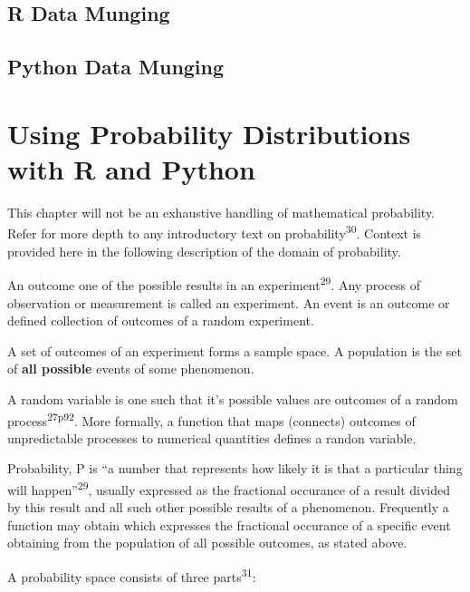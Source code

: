 \documentclass[]{book}
\theoremstyle{definition}
\theoremstyle{definition}
\theoremstyle{definition}
\theoremstyle{remark}
\begin{document}

\section{R Data Munging}\label{r-data-munging}


\section{Python Data Munging}\label{python-data-munging}


\chapter{Using Probability Distributions with R and
Python}\label{using-probability-distributions-with-r-and-python}

This chapter will not be an exhaustive handling of mathematical
probability. Refer for more depth to any introductory text on
probability\textsuperscript{30}. Context is provided here in the
following description of the domain of probability.

An outcome one of the possible results in an
experiment\textsuperscript{29}. Any process of observation or
measurement is called an experiment. An event is an outcome or defined
collection of outcomes of a random experiment.

A set of outcomes of an experiment forms a sample space. A population is
the set of \textbf{all possible} events of some phenomenon.

A random variable is one such that it's possible values are outcomes of
a random process\textsuperscript{27p92}. More formally, a function that
maps (connects) outcomes of unpredictable processes to numerical
quantities defines a randon variable.

 Probability, P is ``a number that represents how
likely it is that a particular thing will happen''\textsuperscript{29},
usually expressed as the fractional occurance of a result divided by
this result and all such other possible results of a phenomenon.
Frequently a function may obtain which expresses the fractional
occurance of a specific event obtaining from the population of all
possible outcomes, as stated above.

A probability space consists of three parts\textsuperscript{31}:
\end{document}
